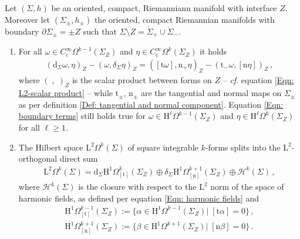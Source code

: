 \begin{theorem}\label{Thm: Hodge decomposition for manifolds with interface}
	Let $(\Sigma,h)$ be an oriented, compact, Riemanniann manifold with interface $Z$.
	Moreover let $(\Sigma_\pm,h_\pm)$ the oriented, compact Riemannian manifolds with boundary $\partial\Sigma_\pm=\pm Z$ such that $\Sigma\setminus Z=\mathring{\Sigma}_+\cup\mathring{\Sigma}_-$.
	\begin{enumerate}
		\item 
		For all $\omega\in C^{\infty}_\mathrm{c}\Omega^{k-1}(\Sigma_Z)$ and $\eta\in C^{\infty}_\mathrm{c}\Omega^k(\Sigma_Z)$ it holds
		\begin{align}\label{Eqn: boundary terms with interface}
			(\mathrm{d}_\Sigma\omega,\eta)_Z-(\omega,\delta_\Sigma\eta)_Z=
			([\mathrm{t}\omega],\mathrm{n}_+\eta)_Z-(\mathrm{t}_-\omega,[\mathrm{n}\eta])_Z\,,
		\end{align}
		where $(\;,\;)_Z$ is the scalar product between forms on $Z$ -- \textit{cf}. equation \eqref{Eqn: L2-scalar product} -- while $\mathrm{t}_\pm$, $\mathrm{n}_\pm$ are the tangential and normal maps on $\Sigma_\pm$ as per definition \ref{Def: tangential and normal component}.
		Equation \eqref{Eqn: boundary terms} still holds true for $\omega\in \mathrm{H}^\ell\Omega^{k-1}(\Sigma_Z)$ and $\eta\in \mathrm{H}^\ell\Omega^k(\Sigma_Z)$ for all $\ell\geq 1$.
		\item
		The Hilbert space $\mathrm{L}^2\Omega^k(\Sigma)$ of square integrable $k$-forms splits into the $\mathrm{L}^2$-orthogonal direct sum
		\begin{align}\label{Eqn: Hodge decomposition for manifold with interface}
			\mathrm{L}^2\Omega^k(\Sigma)=
			\mathrm{d}_\Sigma \mathrm{H}^1\Omega^k_{[\mathrm{t}]}(\Sigma_Z)\oplus
			\delta_\Sigma \mathrm{H}^1\Omega^{k+1}_{[\mathrm{n}]}(\Sigma_Z)\oplus\mathcal{H}^k(\Sigma)\,,		
		\end{align}
		where $\mathcal{H}^k(\Sigma)$ is the closure with respect to the $\mathrm{L}^2$ norm of the space of harmonic fields, as defined per equation \eqref{Eqn: harmonic fields} and
		\begin{align}\label{Eqn: Dirichlet and Neumann jump forms}
			\mathrm{H}^1\Omega^{k-1}_{[\mathrm{t}]}(\Sigma_Z):=\lbrace\alpha\in \mathrm{H}^1\Omega^{k-1}(\Sigma_Z)|\;[\mathrm{t}\alpha]=0\rbrace\,,\\
			\mathrm{H}^1\Omega^{k+1}_{[\mathrm{n}]}(\Sigma_Z):=\lbrace\beta\in \mathrm{H}^1\Omega^{k+1}(\Sigma_Z)|\;[\mathrm{n}\beta]=0\rbrace\,.
		\end{align}
	\end{enumerate}
\end{theorem}
